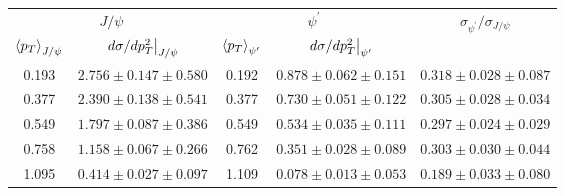 \begin{tabular}{cc|cc|c}
\hline
\multicolumn{2}{c|}{$J/\psi$} &
  \multicolumn{2}{c|}{$\psi^{\prime}$} &
  \multirow{2}{*}{$\sigma_{\psi^\prime}/\sigma_{J/\psi}$} \\ \cline{1-4}
$\expval{p_T}_{J/\psi}$ &
  $\eval{d\sigma/dp_T^2}_{J/\psi}$ &
  $\expval{p_T}_{\psi^\prime}$ &
  $\eval{d\sigma/dp_T^2}_{\psi^\prime}$ &
   \\ \hline
\multicolumn{1}{c|}{0.193} &
  $2.756\pm0.147\pm0.580$ &
  \multicolumn{1}{c|}{0.192} &
  $0.878\pm0.062\pm0.151$ &
  $0.318\pm0.028\pm0.087$ \\
\multicolumn{1}{c|}{0.377} &
  $2.390\pm0.138\pm0.541$ &
  \multicolumn{1}{c|}{0.377} &
  $0.730\pm0.051\pm0.122$ &
  $0.305\pm0.028\pm0.034$ \\
\multicolumn{1}{c|}{0.549} &
  $1.797\pm0.087\pm0.386$ &
  \multicolumn{1}{c|}{0.549} &
  $0.534\pm0.035\pm0.111$ &
  $0.297\pm0.024\pm0.029$ \\
\multicolumn{1}{c|}{0.758} &
  $1.158\pm0.067\pm0.266$ &
  \multicolumn{1}{c|}{0.762} &
  $0.351\pm0.028\pm0.089$ &
  $0.303\pm0.030\pm0.044$ \\
\multicolumn{1}{c|}{1.095} &
  $0.414\pm0.027\pm0.097$ &
  \multicolumn{1}{c|}{1.109} &
  $0.078\pm0.013\pm0.053$ &
  $0.189\pm0.033\pm0.080$ \\ \hline
\end{tabular}
